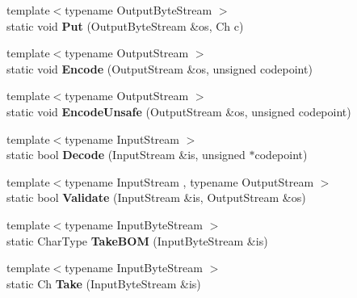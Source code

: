 \begin{DoxyCompactItemize}
\item 
{\footnotesize template$<$typename Output\+Byte\+Stream $>$ }\\static void {\bfseries Put} (Output\+Byte\+Stream \&os, Ch c)\hypertarget{struct_a_s_c_i_i_a218b244b9cd961ea6c5775a734cec20e}{}\label{struct_a_s_c_i_i_a218b244b9cd961ea6c5775a734cec20e}

\item 
{\footnotesize template$<$typename Output\+Stream $>$ }\\static void {\bfseries Encode} (Output\+Stream \&os, unsigned codepoint)\hypertarget{struct_a_s_c_i_i_af56b1605fe233c54693facc7de457f72}{}\label{struct_a_s_c_i_i_af56b1605fe233c54693facc7de457f72}

\item 
{\footnotesize template$<$typename Output\+Stream $>$ }\\static void {\bfseries Encode\+Unsafe} (Output\+Stream \&os, unsigned codepoint)\hypertarget{struct_a_s_c_i_i_afeb90d6f04771067b83b35a0f366af46}{}\label{struct_a_s_c_i_i_afeb90d6f04771067b83b35a0f366af46}

\item 
{\footnotesize template$<$typename Input\+Stream $>$ }\\static bool {\bfseries Decode} (Input\+Stream \&is, unsigned $\ast$codepoint)\hypertarget{struct_a_s_c_i_i_a44844bbfd0a4fc282993fd72f3f58eee}{}\label{struct_a_s_c_i_i_a44844bbfd0a4fc282993fd72f3f58eee}

\item 
{\footnotesize template$<$typename Input\+Stream , typename Output\+Stream $>$ }\\static bool {\bfseries Validate} (Input\+Stream \&is, Output\+Stream \&os)\hypertarget{struct_a_s_c_i_i_a398680588a09e6ce9b56e32195047c78}{}\label{struct_a_s_c_i_i_a398680588a09e6ce9b56e32195047c78}

\item 
{\footnotesize template$<$typename Input\+Byte\+Stream $>$ }\\static Char\+Type {\bfseries Take\+B\+OM} (Input\+Byte\+Stream \&is)\hypertarget{struct_a_s_c_i_i_aad78500eb98f45582a4df020e3fb2278}{}\label{struct_a_s_c_i_i_aad78500eb98f45582a4df020e3fb2278}

\item 
{\footnotesize template$<$typename Input\+Byte\+Stream $>$ }\\static Ch {\bfseries Take} (Input\+Byte\+Stream \&is)\hypertarget{struct_a_s_c_i_i_ab1b9fdf0a5c05658d62fded913d923a3}{}\label{struct_a_s_c_i_i_ab1b9fdf0a5c05658d62fded913d923a3}


\end{DoxyCompactItemize}
